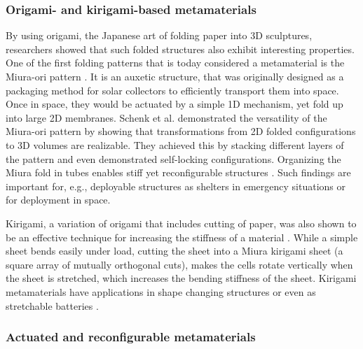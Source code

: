 {%


\subsubsection{Origami- and kirigami-based metamaterials}

By using origami, the Japanese art of folding paper into 3D sculptures, researchers showed that such folded structures also exhibit interesting properties. One of the first folding patterns that is today considered a metamaterial is the Miura-ori pattern \cite{Miura1985}. It is an auxetic structure, that was originally designed as a packaging method for solar collectors to efficiently transport them into space. Once in space, they would be actuated by a simple 1D mechanism, yet fold up into large 2D membranes. Schenk et al. \cite{Schenk2013} demonstrated the versatility of the Miura-ori pattern by showing that transformations from 2D folded configurations to 3D volumes are realizable. They achieved this by stacking different layers of the pattern and even demonstrated self-locking configurations. Organizing the Miura fold in tubes enables stiff yet reconfigurable structures \cite{Filipov2015}. Such findings are important for, e.g., deployable structures as shelters in emergency situations or for deployment in space. 

Kirigami, a variation of origami that includes cutting of paper, was also shown to be an effective technique for increasing the stiffness of a material \cite{Rafsanjani2017}. While a simple sheet bends easily under load, cutting the sheet into a Miura kirigami sheet (a square array of mutually orthogonal cuts), makes the cells rotate vertically when the sheet is stretched, which increases the bending stiffness of the sheet. Kirigami metamaterials have applications in shape changing structures \cite{Neville2016} or even as stretchable batteries \cite{Song2015}.



\subsubsection{Actuated and reconfigurable metamaterials}

}
